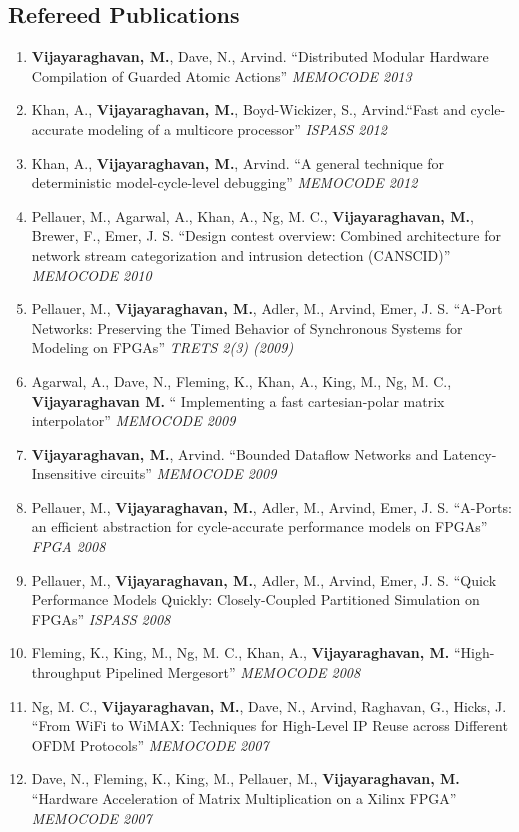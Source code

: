 \documentclass[margin,line]{resume}
\begin{document}
\begin{resume}
    \section{\mysidestyle Refereed Publications}
    \begin{enumerate}
    \item \textbf{Vijayaraghavan, M.}, Dave, N., Arvind.
    ``Distributed Modular Hardware Compilation of Guarded Atomic Actions'' \textit{MEMOCODE 2013}
    \item Khan, A., \textbf{Vijayaraghavan, M.}, Boyd-Wickizer, S., Arvind.``Fast and cycle-accurate modeling of 
    a multicore processor''
    \textit {ISPASS 2012}
    \item Khan, A., \textbf{Vijayaraghavan, M.}, Arvind. ``A general technique for deterministic model-cycle-level debugging''
    \textit{MEMOCODE 2012}
    \item Pellauer, M., Agarwal, A., Khan, A., Ng, M. C., \textbf{Vijayaraghavan, M.}, Brewer, F., Emer, J. S. 
    ``Design contest overview: Combined architecture for network stream categorization and intrusion detection (CANSCID)''
    \textit{MEMOCODE 2010}
    \item Pellauer, M., \textbf{Vijayaraghavan, M.}, Adler, M., Arvind, Emer, J. S.
    ``A-Port Networks: Preserving the Timed Behavior of Synchronous Systems for
    Modeling on FPGAs'' \textit{TRETS 2(3) (2009)}
    \item Agarwal, A., Dave, N., Fleming, K., Khan, A., King, M., Ng, M. C., \textbf{Vijayaraghavan M.} ``
    Implementing a fast cartesian-polar matrix interpolator'' \textit{MEMOCODE 2009}
    \item \textbf{Vijayaraghavan, M.}, Arvind. ``Bounded Dataflow Networks and
    Latency-Insensitive circuits'' \textit{MEMOCODE 2009}
    \item Pellauer, M.,
    \textbf{Vijayaraghavan, M.}, Adler, M., Arvind, Emer, J. S. ``A-Ports: an
    efficient abstraction for cycle-accurate performance models on FPGAs''
    \textit{FPGA 2008}
    \item Pellauer, M., \textbf{Vijayaraghavan, M.}, Adler, M., Arvind, Emer,
    J. S. ``Quick Performance Models Quickly: Closely-Coupled Partitioned
    Simulation on FPGAs'' \textit{ISPASS 2008}
    \item Fleming, K., King, M., Ng, M. C., Khan, A., \textbf{Vijayaraghavan, M.} ``High-throughput Pipelined Mergesort'' \textit{MEMOCODE 2008}
    \item Ng, M. C., \textbf{Vijayaraghavan, M.}, Dave, N., Arvind, Raghavan, G., Hicks, J. ``From WiFi to WiMAX: Techniques for High-Level IP Reuse across Different OFDM Protocols'' \textit{MEMOCODE 2007}
    \item Dave, N., Fleming, K., King, M., Pellauer, M., \textbf{Vijayaraghavan, M.} ``Hardware Acceleration of Matrix Multiplication on a Xilinx FPGA'' \textit{MEMOCODE 2007}
    \end{enumerate}


\end{resume}
\end{document}
